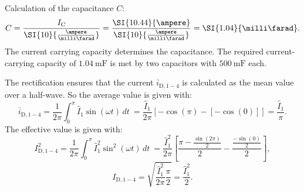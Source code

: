 \begin{solutionblock}
    Calculation of the capacitance $C$:
    \begin{equation}
        C = \frac{I_\mathrm{C}}{\SI{10}{\frac{\ampere}{\milli\farad}}} = \frac{\SI{10.44}{\ampere}}{\SI{10}{\frac{\ampere}{\milli\farad}}}=\SI{1.04}{\milli\farad}.
    \end{equation}
    The current carrying capacity determines the capacitance. The required current-carrying capacity of $\SI{1.04}{\milli\farad}$ is met by two capacitors with $\SI{500}{\milli\farad}$ each. 
\end{solutionblock}
\begin{solutionblock}
    The rectification ensures that the current $\overline i_\mathrm{D,1-4}$ is calculated as the mean value over a half-wave. So the average value is given with:
    \begin{equation}
        \overline{i}_{\mathrm{D,1-4}} = \frac{1}{2\pi} \int_{0}^{\pi} \hat{I}_{\mathrm{1}} \sin(\omega t) \, dt\ = \frac{\hat{I}_{\mathrm{1}}}{2\pi} [-\cos(\pi)-[-\cos(0)]] = \frac{\hat{I}_{\mathrm{1}}}{\pi}.
    \end{equation}
    The effective value is given with:
    \begin{equation}
        I^2_{\mathrm{D,1-4}} = \frac{1}{2\pi} \int_{0}^{\pi} \hat{I}^2_{\mathrm{1}} \sin^2(\omega t) \, dt\ = \frac{\hat{I}^2_{\mathrm{1}}}{2\pi}\left[\frac{\pi-\frac{\sin(2\pi)}{2}}{2}-\frac{\frac{-\sin(0)}{2}}{2}\right], 
    \end{equation}
    \begin{equation}
        I_{\mathrm{D,1-4}} = \sqrt{\frac{\hat{I}^2_{\mathrm{1}}}{2\pi}\frac{\pi}{2}} = \frac{\hat{I}^2_{\mathrm{1}}}{2}.
    \end{equation}
\end{solutionblock}